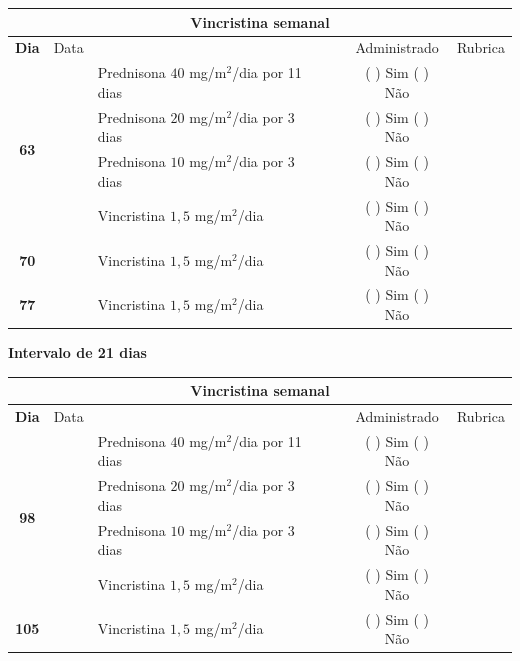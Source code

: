 \documentclass[11pt,a4paper,oldfontcommands]{memoir}
\begin{document}
\begin{center}
\begin{longtable}{p{1cm}c|p{5cm}|p{1cm}p{2cm}|c|c}
	\hline
	\multicolumn{7}{c}{Vincristina semanal} \\
	\hline
	\multicolumn{1}{c|}{\multirow{1}{*}{\textbf{Dia}}}&{Data}&{}&{}&&{Administrado}&{Rubrica} \\
    \hline
    \multicolumn{1}{c|}{\multirow{4}{*}{\textbf{63}}}&&{Prednisona \(40\) mg/m\(^2\)/dia por 11 dias}&\multicolumn{1}{c}{}&&{(  ) Sim (  ) Não}&\\
    \multicolumn{1}{c|}{}&&{Prednisona \(20\) mg/m\(^2\)/dia por 3 dias}&\multicolumn{1}{c}{}&&{(  ) Sim (  ) Não}&\\
    \multicolumn{1}{c|}{}&&{Prednisona \(10\) mg/m\(^2\)/dia por 3 dias}&\multicolumn{1}{c}{}&&{(  ) Sim (  ) Não}&\\
    \multicolumn{1}{c|}{\textbf{}}&&{Vincristina \(1,5\) mg/m\(^2\)/dia}&\multicolumn{1}{c}{}&&{(  ) Sim (  ) Não}&\\
    \cline{1-6}
    \multicolumn{1}{c|}{\textbf{70}}&&{Vincristina \(1,5\) mg/m\(^2\)/dia}&\multicolumn{1}{c}{}&&{(  ) Sim (  ) Não}&\\
    \cline{1-3}\cline{6-6}
    \multicolumn{1}{c|}{\textbf{77}}&&{Vincristina \(1,5\) mg/m\(^2\)/dia}&\multicolumn{1}{c}{}&&{(  ) Sim (  ) Não}&\\
    \hline
\end{longtable}
\textbf{Intervalo de 21 dias}
\begin{longtable}{p{1cm}c|p{5cm}|p{1cm}p{2cm}|c|c}
	\hline
	\multicolumn{7}{c}{Vincristina semanal} \\
	\hline
	\multicolumn{1}{c|}{\multirow{1}{*}{\textbf{Dia}}}&{Data}&{}&{}&&{Administrado}&{Rubrica} \\
    \hline
    \multicolumn{1}{c|}{\multirow{4}{*}{\textbf{98}}}&&{Prednisona \(40\) mg/m\(^2\)/dia por 11 dias}&\multicolumn{1}{c}{}&&{(  ) Sim (  ) Não}&\\
    \multicolumn{1}{c|}{}&&{Prednisona \(20\) mg/m\(^2\)/dia por 3 dias}&\multicolumn{1}{c}{}&&{(  ) Sim (  ) Não}&\\
    \multicolumn{1}{c|}{}&&{Prednisona \(10\) mg/m\(^2\)/dia por 3 dias}&\multicolumn{1}{c}{}&&{(  ) Sim (  ) Não}&\\
    \multicolumn{1}{c|}{\textbf{}}&&{Vincristina \(1,5\) mg/m\(^2\)/dia}&\multicolumn{1}{c}{}&&{(  ) Sim (  ) Não}&\\
    \cline{1-6}
    \multicolumn{1}{c|}{\textbf{105}}&&{Vincristina \(1,5\) mg/m\(^2\)/dia}&\multicolumn{1}{c}{}&&{(  ) Sim (  ) Não}&\\

\end{longtable}
\end{center}
\end{document}
